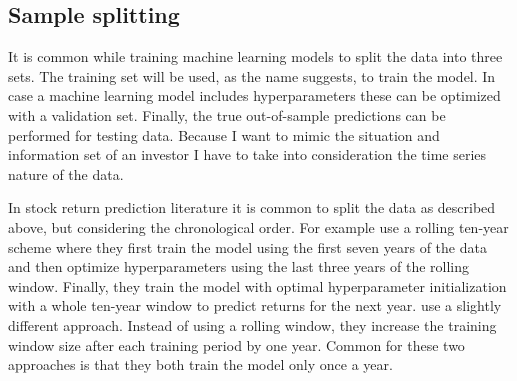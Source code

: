 \documentclass[12pt]{article}
\begin{document}
\subsection{Sample splitting} \label{SampleSplitting}

It is common while training machine learning models to split the data into three sets. The training set will be used, as the name suggests, to train the model. In case a machine learning model includes hyperparameters these can be optimized with a validation set. Finally, the true out-of-sample predictions can be performed for testing data. Because I want to mimic the situation and information set of an investor I have to take into consideration the time series nature of the data. \par

In stock return prediction literature it is common to split the data as described above, but considering the chronological order. For example \citet{Fieberg} use a rolling ten-year scheme where they first train the model using the first seven years of the data and then optimize hyperparameters using the last three years of the rolling window.\footnotemark {} Finally, they train the model with optimal hyperparameter initialization with a whole ten-year window to predict returns for the next year. \citet{guetal} use a slightly different approach. Instead of using a rolling window, they increase the training window size after each training period by one year.\footnotemark {} Common for these two approaches is that they both train the model only once a year. \par
\end{document}
